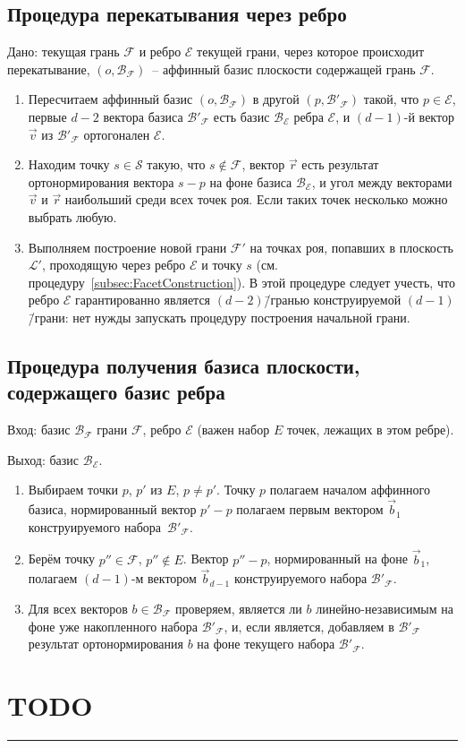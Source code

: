 \documentclass[a4paper,12pt]{article}
\newcommand{\Swarm}{\mathcal{S}}              %
\newcommand{\Facet}{\mathcal{F}}              %
\newcommand{\Edge}{\mathcal{E}}               %
\newcommand{\Basis}{\mathcal{B}}              %
\newcommand{\Plane}{\mathcal{L}}           %
\renewcommand{\.}{\hspace{0.2ex}}
\begin{document}
  \subsection{Процедура перекатывания через ребро}
    Дано: текущая грань $\Facet$ и ребро $\Edge$ текущей грани, через которое происходит перекатывание, $(o, \Basis_{\Facet})$~-- аффинный базис плоскости содержащей грань $\Facet$.

    \begin{enumerate}
      \item Пересчитаем аффинный базис $(o, \Basis_{\Facet})$ в другой $(p, \Basis'_{\Facet})$ такой, что $p \in \Edge$, первые $d-2$ вектора базиса $\Basis'_{\Facet}$ есть базис $\Basis_{\Edge}$ ребра $\Edge$, и $(d-1)$-й вектор $\vec v$ из $\Basis'_{\Facet}$ ортогонален $\Edge$.
      \item Находим точку $s \in \Swarm$ такую, что $s \notin \Facet$, вектор $\vec r$ есть результат ортонормирования вектора $s - p$ на фоне базиса $\Basis_{\Edge}$, и угол между векторами $\vec v$ и $\vec r$ наибольший среди всех точек роя. Если таких точек несколько можно выбрать любую.
      \item Выполняем построение новой грани $\Facet'$ на точках роя, попавших в плоскость $\Plane'$, проходящую через ребро $\Edge$ и точку $s$ (см. процедуру~\ref{subsec:FacetConstruction}). В этой процедуре следует учесть, что ребро $\Edge$ гарантированно является $(d-2)$\=/гранью конструируемой $(d-1)$\=/грани: нет нужды запускать процедуру построения начальной грани.
    \end{enumerate}

  \subsection{Процедура получения базиса плоскости, содержащего базис ребра}
    Вход: базис $\Basis_{\Facet}$ грани $\Facet$, ребро $\Edge$ (важен набор $E$ точек, лежащих в этом ребре).

    Выход: базис $\Basis_{\Edge}$.
    \begin{enumerate}
      \item Выбираем точки $p$, $p'$ из $E$, $p \neq p'$. Точку $p$ полагаем началом аффинного базиса, нормированный вектор $p'-p$ полагаем первым вектором $\vec b_1$ конструируемого набора~$\Basis'_{\Facet}$.
      \item Берём точку $p'' \in \Facet$, $p'' \notin E$. Вектор $p''-p$, нормированный на фоне $\vec b_1$, полагаем $(d-1)$-м вектором $\vec b_{d-1}$ конструируемого набора $\Basis'_{\Facet}$.
      \item Для всех векторов $b \in \Basis_{\Facet}$ проверяем, является ли $b$ линейно-независимым на фоне уже накопленного набора $\Basis'_{\Facet}$, и, если является, добавляем в $\Basis'_{\Facet}$ результат ортонормирования $b$ на фоне текущего набора $\Basis'_{\Facet}$.
    \end{enumerate}


\section{TODO}

  \hrule
\end{document}
